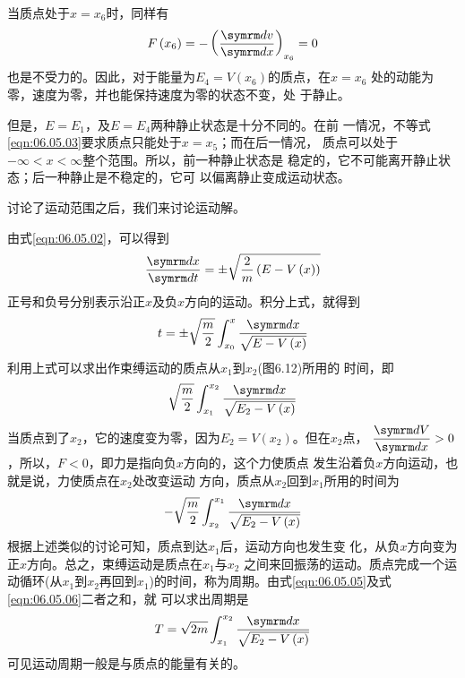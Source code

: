 当质点处于$ x = x_6 $时，同样有
\begin{equation*}
  F \left( x _ { 6 } \right) = - \left( \frac { \dif v } { \dif x } \right) _ { x _ 6 } = 0
\end{equation*}
也是不受力的。因此，对于能量为$  E _ { 4 } = V \left( x _ { 6 } \right)   $的质点，在$  x = x _ { 6 }  $
处的动能为零，速度为零，并也能保持速度为零的状态不变，处
于静止。

但是，$  E = E _ { 1 }   $，及$  E = E _ 4 $两种静止状态是十分不同的。在前
一情况，不等式\eqref{eqn:06.05.03}要求质点只能处于$  x = x _ { 5 } $；而在后一情况，
质点可以处于$ - \infty < x < \infty   $整个范围。所以，前一种静止状态是
稳定的，它不可能离开静止状态；后一种静止是不稳定的，它可
以偏离静止变成运动状态。

讨论了运动范围之后，我们来讨论运动解。

由式\eqref{eqn:06.05.02}，可以得到
\begin{equation*}
  \frac { \dif x } { \dif t } = \pm \sqrt { \frac { 2 } { m } \left( E - V \left( x \right) \right) }
\end{equation*}
正号和负号分别表示沿正$ x $及负$ x $方向的运动。积分上式，就得到
\begin{equation}\label{eqn:06.05.04}
  t = \pm \sqrt { \frac { m } { 2 } } \int _ { x _ { 0 } } ^ { x } \frac { \dif x } { \sqrt { E - V \left( x \right) } }
\end{equation}
利用上式可以求出作束缚运动的质点从$ x_1 $到$ x_2 $(图6.12)所用的
时间，即
\begin{equation}\label{eqn:06.05.05}
  \sqrt { \frac { m } { 2 } } \int _ { x _ { 1 } } ^ { x _ { 2 } } \frac { \dif x } { \sqrt { E _ { 2 } - V \left( x \right) } }
\end{equation}
当质点到了$ x_2 $，它的速度变为零，因为$  E _ { 2 } = V \left( x _ { 2 } \right)   $。但在$ x_2 $点，
$ \dfrac { \dif V } { \dif x } > 0   $
，所以，$  F < 0  $，即力是指向负$ x $方向的，这个力使质点
发生沿着负$ x $方向运动，也就是说，力使质点在$ x_2 $处改变运动
方向，质点从$ x_2 $回到$ x_1 $所用的时间为
\begin{equation}\label{eqn:06.05.06}
  - \sqrt { \frac { m } { 2 } } \int _ { x _ { 2 } } ^ { x _ { 1 } }  \frac { \dif x } { \sqrt { E _ { 2 } - V \left( x \right) } }
\end{equation}
根据上述类似的讨论可知，质点到达$ x_1 $后，运动方向也发生变
化，从负$ x $方向变为正$ x $方向。总之，束缚运动是质点在$ x_1 $与$ x_2 $
之间来回振荡的运动。质点完成一个运动循环(从$ x_1 $到$ x_2 $再回到$
  x _ { 1 } $)的时间，称为周期。由式\eqref{eqn:06.05.05}及式\eqref{eqn:06.05.06}二者之和，就
可以求出周期是
\begin{equation}\label{eqn:06.05.07}
  T = \sqrt { 2 m } \int _ { x _ { 1 } } ^ { x _ { 2 } } \frac { \dif x } { \sqrt { { E _ { 2 } - V \left( x \right) } } }
\end{equation}
可见运动周期一般是与质点的能量有关的。

